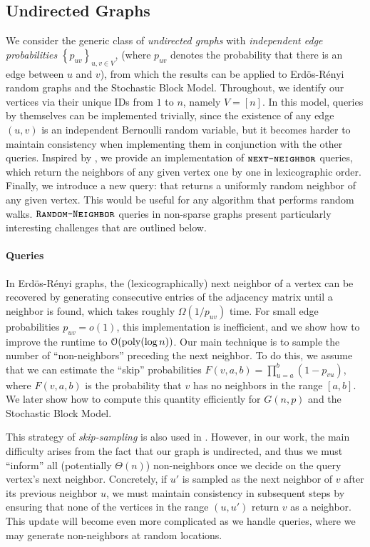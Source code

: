 \subsection{Undirected Graphs}
\label{sec:undirected_graphs}
We consider the generic class of \emph{undirected graphs} with {\em independent edge probabilities} $\left\{ p_{uv} \right\}_{u,v\in V}$,
(where $p_{uv}$ denotes the probability that there is an edge between $u$ and $v$),
from which the results can be applied to Erd\"os-R\'enyi random graphs and the Stochastic Block Model.
Throughout, we identify our vertices via their unique IDs from $1$ to $n$, namely $V = [n]$.
In this model,  queries by themselves can be implemented trivially,
since the existence of any edge $(u,v)$ is an independent Bernoulli random variable,
but it becomes harder to maintain consistency when implementing them in conjunction with the other queries.
Inspired by \cite{reut}, we provide an implementation of $\texttt{\textsc{next-neighbor}}$ queries,
which return the neighbors of any given vertex one by one in lexicographic order.
Finally, we introduce a new query:  that returns a uniformly random neighbor of any given vertex.
This would be useful for any algorithm that performs random walks.
$\texttt{\textsc{Random-Neighbor}}$ queries in non-sparse graphs present particularly interesting challenges that are outlined below.

\paragraph*{ Queries}
\label{par:next_neighbor_queries}
In Erd\"os-R\'enyi graphs, the (lexicographically) next neighbor of a vertex can be recovered by generating consecutive entries
of the adjacency matrix until a neighbor is found, which takes roughly $\Omega(1/p_{uv})$ time.
For small edge probabilities $p_{uv} = o(1)$, this implementation is inefficient, and we show how to improve the runtime to $\mathcal O(\mathrm{poly}(\log n))$.
Our main technique is to sample the number of ``non-neighbors'' preceding the next neighbor.
To do this, we assume that we can estimate the ``skip'' probabilities $F(v,a,b)=\prod^{b}_{u=a} (1-p_{vu})$,
where $F(v,a,b)$ is the probability that $v$ has no neighbors in the range $[a,b]$.
We later show how to compute this quantity efficiently for $G(n,p)$ and the Stochastic Block Model.

This strategy of \emph{skip-sampling} is also used in \cite{reut}.
However, in our work, the main difficulty arises from the fact that our graph is undirected,
and thus we must ``inform'' all (potentially $\Theta(n)$) non-neighbors once we decide on the query vertex's next neighbor.
Concretely, if $u'$ is sampled as the next neighbor of $v$ after its previous neighbor $u$,
we must maintain consistency in subsequent steps by ensuring that none of the vertices in the range $(u,u')$ return $v$ as a neighbor.
This update will become even more complicated as we handle  queries, where we may generate non-neighbors at random locations.

